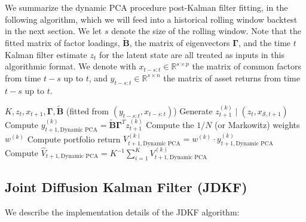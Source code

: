\documentclass[11pt]{article}
\theoremstyle{plain}
\theoremstyle{definition}
\theoremstyle{remark}
\numberwithin{equation}{section}
\begin{document}
We summarize the dynamic PCA procedure post-Kalman filter fitting, in the following algorithm, which we will feed into a historical rolling window backtest in the next section. We let $s$ denote the size of the rolling window. Note that the fitted matrix of factor loadings, $\mathbf{\tilde{B}}$, the matrix of eigenvectors $\mathbf{\Gamma}$, and the time $t$ Kalman filter estimate $z_t$ for the latent state are all treated as inputs in this algorithmic format. We denote with $x_{t-s:t} \in \mathbb{R}^{s \times p}$ the matrix of common factors from time $t-s$ up to $t$, and $y_{t-s:t} \in \mathbb{R}^{s \times n}$ the matrix of asset returns from time $t-s$ up to $t$. 

\begin{algorithm}[H]
\caption{Dynamic PCA Portfolio Simulation} \label{alg:dynamic_pca}
\begin{algorithmic}[1]
\Require $K, z_t, x_{t+1}, \mathbf{\Gamma}, \mathbf{\tilde{B}}$ (fitted from $(y_{t-s:t}, x_{t-s:t})$)
    \State Generate $z_{t+1}^{(k)} \mid (z_t, x_{\mathcal{S},t+1})$ 
    \State Compute $y_{t+1, \text{Dynamic PCA}}^{(k)}=\mathbf{\tilde{B}} \mathbf{\Gamma}^T z_{t+1}^{(k)}$
    \State Compute the $1/N$ (or Markowitz) weights $w^{(k)}$
    \State Compute portfolio return $V_{t+1, \text{Dynamic PCA}}^{(k)}=w^{(k)} \cdot y_{t+1,\text{Dynamic PCA}}^{(k)}$
\EndFor
\State Compute $\hat{V}_{t+1, \text{Dynamic PCA}}=K^{-1}\sum_{i=1}^K V_{t+1,\text{Dynamic PCA}}^{(k)}$
\end{algorithmic}
\end{algorithm}


\subsection{Joint Diffusion Kalman Filter (JDKF)}
\label{app:jdkf_implementation}
We describe the implementation details of the JDKF algorithm:
\end{document}
